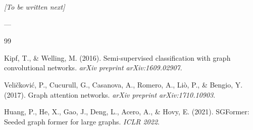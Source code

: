 \documentclass[11pt, a4paper]{article}
\begin{document}
\emph{[To be written next]}

---

\begin{thebibliography}{99}

 Kipf, T., \& Welling, M. (2016). Semi-supervised classification with graph convolutional networks. \textit{arXiv preprint arXiv:1609.02907}.

 Veličković, P., Cucurull, G., Casanova, A., Romero, A., Liò, P., \& Bengio, Y. (2017). Graph attention networks. \textit{arXiv preprint arXiv:1710.10903}.

 Huang, P., He, X., Gao, J., Deng, L., Acero, A., \& Hovy, E. (2021). SGFormer: Seeded graph former for large graphs. \textit{ICLR 2022}.

\end{thebibliography}
\end{document}
